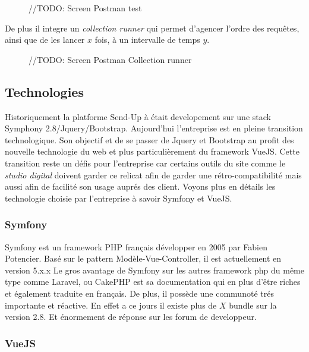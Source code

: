 \begin{figure}[htbp]
    \center
        //TODO: Screen Postman test
\end{figure}

De plus il integre un \textit{collection runner} qui permet d'agencer l'ordre des requêtes, ainsi que de les lancer $x$ fois, à un intervalle de temps $y$. 

\begin{figure}[htbp]
    \center
        //TODO: Screen Postman Collection runner
\end{figure}

\subsection{Technologies}

Historiquement la platforme Send-Up à était developement sur une stack Symphony 2.8/Jquery/Bootstrap. Aujourd'hui l'entreprise est en pleine transition technologique. Son objectif et de se passer de Jquery et Bootstrap au profit des nouvelle technologie du web et plus particulièrement du framework VueJS. Cette transition reste un défis pour l'entreprise car certains outils du site comme le \textit{studio digital} doivent garder ce relicat afin de garder une rétro-compatibilité mais aussi afin de facilité son usage auprés des client. Voyons plus en détails les technologie choisie par l'entreprise à savoir Symfony et VueJS.

\subsubsection{Symfony}
Symfony est un framework PHP français développer en 2005 par Fabien Potencier. Basé sur le pattern Modèle-Vue-Controller, il est actuellement en version 5.x.x  Le gros avantage de Symfony sur les autres framework php du même type comme Laravel, ou CakePHP est sa documentation qui en plus d'être riches et également traduite en français. De plus, il possède une communoté trés importante et réactive. En effet a ce jours il existe plus de $X$ bundle sur la version 2.8. Et énormement de réponse sur les forum de developpeur.


\subsubsection{VueJS}

